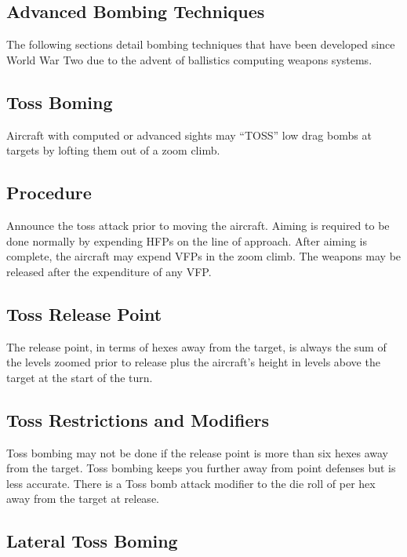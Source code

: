 \begin{advancedrules}

    \section{Advanced Bombing Techniques}

    The following sections detail bombing techniques that have been developed since World War Two due to the advent of ballistics computing weapons systems.

    \subsection{Toss Boming}

    Aircraft with computed or advanced sights may “TOSS” low drag bombs at targets by lofting them out of a zoom climb.

    \subsection{Procedure} Announce the toss attack prior to moving the aircraft. Aiming is required to be done normally by expending HFPs on the line of approach. After aiming is complete, the aircraft may expend VFPs in the zoom climb. The weapons may be released after the expenditure of any VFP.

    \subsection{Toss Release Point} The release point, in terms of hexes away from the target, is always the sum of the levels zoomed prior to release plus the aircraft's height in levels above the target at the start of the turn.

    \subsection{Toss Restrictions and Modifiers} Toss bombing may not be done if the release point is more than six hexes away from the target. Toss bombing keeps you further away from point defenses but is less accurate. There is a Toss bomb attack modifier to the die roll of  per hex away from the target at release.

    \subsection{Lateral Toss Boming}


\end{advancedrules}
